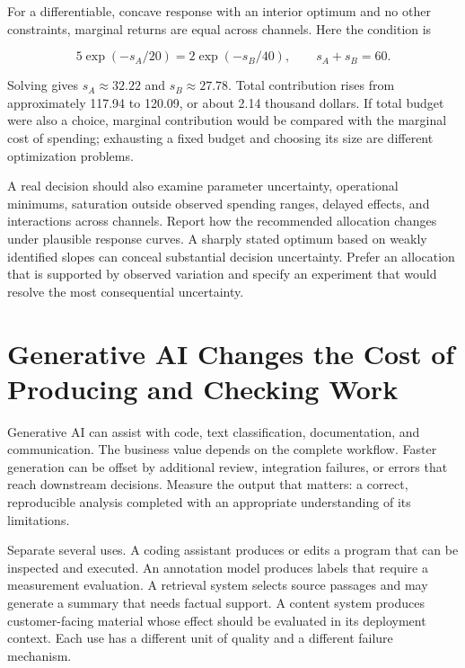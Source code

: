 For a differentiable, concave response with an interior optimum and no
other constraints, marginal returns are equal across channels. Here the
condition is

\[
5\exp(-s_A/20)=2\exp(-s_B/40),\qquad s_A+s_B=60.
\]

Solving gives \(s_A\approx32.22\) and \(s_B\approx27.78\). Total
contribution rises from approximately 117.94 to 120.09, or about 2.14
thousand dollars. If total budget were also a choice, marginal
contribution would be compared with the marginal cost of spending;
exhausting a fixed budget and choosing its size are different
optimization problems.

A real decision should also examine parameter uncertainty, operational
minimums, saturation outside observed spending ranges, delayed effects,
and interactions across channels. Report how the recommended allocation
changes under plausible response curves. A sharply stated optimum based
on weakly identified slopes can conceal substantial decision
uncertainty. Prefer an allocation that is supported by observed
variation and specify an experiment that would resolve the most
consequential uncertainty.

\hypertarget{M08-generative-ai-changes-the-cost-of-producing-and-checking-work}{%
\section{Generative AI Changes the Cost of Producing and Checking
Work}\label{M08-generative-ai-changes-the-cost-of-producing-and-checking-work}}

\noindent Generative AI can assist with code, text classification, documentation,
and communication. The business value depends on the complete workflow.
Faster generation can be offset by additional review, integration
failures, or errors that reach downstream decisions. Measure the output
that matters: a correct, reproducible analysis completed with an
appropriate understanding of its limitations.

Separate several uses. A coding assistant produces or edits a program
that can be inspected and executed. An annotation model produces labels
that require a measurement evaluation. A retrieval system selects source
passages and may generate a summary that needs factual support. A
content system produces customer-facing material whose effect should be
evaluated in its deployment context. Each use has a different unit of
quality and a different failure mechanism.

